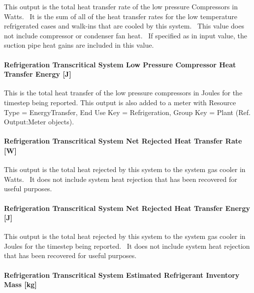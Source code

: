This output is the total heat transfer rate of the low pressure Compressors in Watts.~ It is the sum of all of the heat transfer rates for the low temperature refrigerated cases and walk-ins that are cooled by this system.~ This value does not include compressor or condenser fan heat.~ If specified as in input value, the suction pipe heat gains are included in this value.

\paragraph{Refrigeration Transcritical System Low Pressure Compressor Heat Transfer Energy {[}J{]}}\label{refrigeration-transcritical-system-low-pressure-compressor-heat-transfer-energy-j}

This is the total heat transfer of the low pressure compressors in Joules for the timestep being reported. This output is also added to a meter with Resource Type = EnergyTransfer, End Use Key = Refrigeration, Group Key = Plant (Ref. Output:Meter objects).

\paragraph{Refrigeration Transcritical System Net Rejected Heat Transfer Rate {[}W{]}}\label{refrigeration-transcritical-system-net-rejected-heat-transfer-rate-w}

This output is the total heat rejected by this system to the system gas cooler in Watts.~ It does not include system heat rejection that has been recovered for useful purposes.

\paragraph{Refrigeration Transcritical System Net Rejected Heat Transfer Energy {[}J{]}}\label{refrigeration-transcritical-system-net-rejected-heat-transfer-energy-j}

This output is the total heat rejected by this system to the system gas cooler in Joules for the timestep being reported.~ It does not include system heat rejection that has been recovered for useful purposes.

\paragraph{Refrigeration Transcritical System Estimated Refrigerant Inventory Mass {[}kg{]}}\label{refrigeration-transcritical-system-estimated-refrigerant-inventory-mass-kg}

